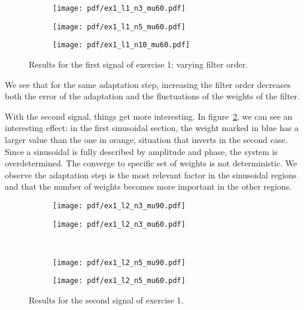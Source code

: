 \begin{figure}
    \centering
    \begin{subfigure}[t]{0.32\columnwidth}
        \centering
        \texttt{[image: pdf/ex1\_l1\_n3\_mu60.pdf]}
        \caption{}
    \end{subfigure} \hfill
    \begin{subfigure}[t]{0.32\columnwidth}
        \centering
        \texttt{[image: pdf/ex1\_l1\_n5\_mu60.pdf]}
        \caption{}
    \end{subfigure} \hfill
    \begin{subfigure}[t]{0.32\columnwidth}
        \centering
        \texttt{[image: pdf/ex1\_l1\_n10\_mu60.pdf]}
        \caption{}
    \end{subfigure}
    \caption{Results for the first signal of exercise 1: varying filter
        order.\label{fig:ex1varyorder}}
\end{figure}
We see that for the same adaptation step, increasing the filter order decreases
both the error of the adaptation and the fluctuations of the weights of the
filter.

With the second signal, things get more interesting. In
figure~\ref{fig:ex1sig2switch}, we can see an interesting effect: in the first
sinusoidal section, the weight marked in blue has a larger value than the one in
orange, situation that inverts in the second case. Since a sinusoidal is fully
described by amplitude and phase, the system is overdetermined. The converge to
specific set of weights is not deterministic. We observe the adaptation step is
the most relevant factor in the sinusoidal regions and that the number of weights
becomes more important in the other regions.
\begin{figure}
    \centering
    \begin{subfigure}[t]{0.32\columnwidth}
        \centering
        \texttt{[image: pdf/ex1\_l2\_n3\_mu90.pdf]}
        \caption{\label{fig:ex1sig2switch}}
    \end{subfigure} %
    \begin{subfigure}[t]{0.32\columnwidth}
        \centering
        \texttt{[image: pdf/ex1\_l2\_n3\_mu60.pdf]}
        \caption{}
    \end{subfigure} \\
    \begin{subfigure}[t]{0.32\columnwidth}
        \centering
        \texttt{[image: pdf/ex1\_l2\_n5\_mu90.pdf]}
        \caption{}
    \end{subfigure} %
    \begin{subfigure}[t]{0.32\columnwidth}
        \centering
        \texttt{[image: pdf/ex1\_l2\_n5\_mu60.pdf]}
        \caption{}
    \end{subfigure}
    \caption{Results for the second signal of exercise 1.\label{fig:ex1sig2}}
\end{figure}

